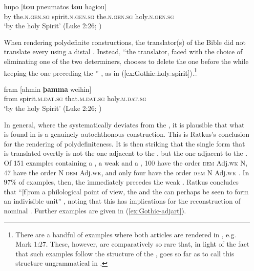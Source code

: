 \documentclass[output=paper,colorlinks,citecolor=brown]{langscibook}
\begin{document}
\begin{exe}     
    \ex\gll\label{ex:Greek-holy-spirit}hupo [\textbf{tou} pneumatos \textbf{tou} hagiou]\\
    by the.\textsc{n.gen.sg} spirit.\textsc{n.gen.sg} the.\textsc{n.gen.sg} holy.\textsc{n.gen.sg}\\
    \glt `by the holy Spirit'  (Luke 2:26; \citealp[139]{ratkus2011})
\end{exe}

When rendering polydefinite constructions, the translator(s) of the  Bible did not translate every   using a distal . Instead, ``the translator, faced with the choice of eliminating one of the two determiners, chooses to delete the one before the  while keeping the one preceding the '' \citep[140]{ratkus2011}, as in (\ref{ex:Gothic-holy-spirit}).\footnote{There are a handful of examples where both articles are rendered in , e.g. Mark 1:27. These, however, are comparatively so rare that, in light of the fact that such examples follow the structure of the , \citet[140]{ratkus2011} goes so far as to call this structure ungrammatical in .}

\begin{exe}     
    \ex\gll\label{ex:Gothic-holy-spirit}fram [ahmin \textbf{þamma} weihin]\\
    from spirit.\textsc{m.dat.sg} that.\textsc{m.dat.sg} holy.\textsc{m.dat.sg}\\
    \glt `by the holy Spirit'  (Luke 2:26; \citealp[139]{ratkus2011})
\end{exe}

In general, where the  systematically deviates from the , it is plausible that what is found in  is a genuinely autochthonous construction. This is Ratkus's conclusion for the rendering of polydefiniteness. It is then striking that the single  form that is translated overtly is not the one adjacent to the , but the one adjacent to the . Of 151 examples containing a , a weak  and a , 100 have the order \textsc{dem} Adj.\textsc{wk} N, 47 have the order N \textsc{dem} Adj.\textsc{wk}, and only four have the order \textsc{dem} N Adj.\textsc{wk} \citep[141]{ratkus2011}. In 97\% of examples, then, the  immediately precedes the weak . Ratkus concludes that ``[f]rom a philological point of view, the  and the  can perhaps be seen to form an indivisible unit'' \citeyearpar[141]{ratkus2011}, noting that this has implications for the reconstruction of  nominal . Further examples are given in (\ref{ex:Gothic-adjart}).
\end{document}
